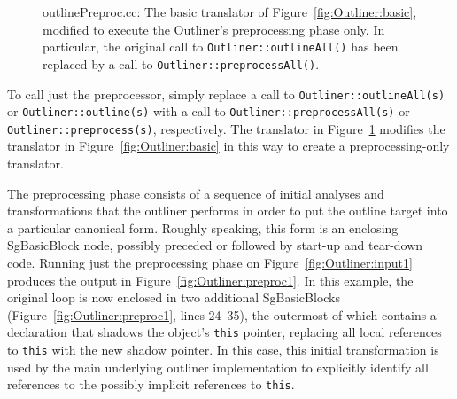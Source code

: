 \begin{figure}[!h]
{\indent
{\mySmallFontSize
\begin{latexonly}
   
\end{latexonly}
\begin{htmlonly}
   
\end{htmlonly}

}
}
\caption{outlinePreproc.cc: The basic translator of
Figure~\ref{fig:Outliner:basic}, modified to execute the
Outliner's preprocessing phase only.  In particular, the original
call to \texttt{Outliner::outlineAll()} has been replaced by a call
to \texttt{Outliner::preprocessAll()}.}
\label{fig:Outliner:preproc}
\end{figure}

To call just the preprocessor, simply replace a call to
\texttt{Outliner::outlineAll(s)} or
\texttt{Outliner::outline(s)} with a call to
\texttt{Outliner::preprocessAll(s)} or
\texttt{Outliner::preprocess(s)}, respectively. The translator in
Figure~\ref{fig:Outliner:preproc} modifies the translator in
Figure~\ref{fig:Outliner:basic} in this way to create a
preprocessing-only translator.

The preprocessing phase consists of a sequence of initial analyses and
transformations that the outliner performs in order to put the
outline target into a particular canonical form. Roughly speaking,
this form is an enclosing SgBasicBlock node, possibly preceded or
followed by start-up and tear-down code. Running just the
preprocessing phase on Figure~\ref{fig:Outliner:input1} produces
the output in Figure~\ref{fig:Outliner:preproc1}. In this example,
the original loop is now enclosed in two additional SgBasicBlocks
(Figure~\ref{fig:Outliner:preproc1}, lines 24--35), the outermost
of which contains a declaration that shadows the object's
\texttt{this} pointer, replacing all local references to \texttt{this}
with the new shadow pointer. In this case, this initial transformation
is used by the main underlying outliner implementation to explicitly
identify all references to the possibly implicit references to
\texttt{this}.

